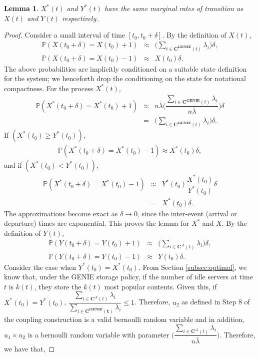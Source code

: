 \documentclass[10pt, conference, letterpaper]{IEEEtran}
\newtheorem{lemma}{Lemma}
\def \idle {k}
\begin{document}
\begin{lemma}
	\label{lemma:marginals}
	$X^*(t)$ and $Y^*(t)$ have the same marginal rates of transition as $X(t)$ and $Y(t)$ respectively.
\end{lemma}
\begin{proof}
	Consider a small interval of time $[t_0, t_0 + \delta]$. By the definition of $X(t)$,
	\begin{eqnarray*}
		\mathbb{P}(X(t_0+\delta) = X(t_0)+1)  &\approx&  \bigg(\sum_{i \in \mathbf{C^{GENIE}}(t)} \lambda_i\bigg) \delta, \\
		\mathbb{P}(X(t_0+\delta) = X(t_0 )-1) &\approx& X(t_0) \delta.
	\end{eqnarray*}
	The above probabilities are implicitly conditioned on a suitable state definition for the system; we henceforth drop the conditioning on the state for notational compactness. For the process $X^*(t)$,
	\begin{eqnarray*}
		\mathbb{P}(X^*(t_0+\delta) = X^*(t_0 )+1) &\approx& n \bar{\lambda} \bigg(\dfrac{\sum_{i \in \mathbf{C^{GENIE}}(t)} \lambda_i}{n \bar{\lambda}}\bigg) \delta \\
		& = & \bigg(\sum_{i \in \mathbf{C^{GENIE}}(t)} \lambda_i\bigg) \delta.
	\end{eqnarray*}
	If $(X^*(t_0) \geq Y^*(t_0))$,
	\begin{eqnarray*}
		\mathbb{P}(X^*(t_0+\delta) = X^*(t_0 )-1) \approx X^*(t_0) \delta,
	\end{eqnarray*}
	and if $(X^*(t_0) < Y^*(t_0))$,
	\begin{eqnarray*}
		\mathbb{P}(X^*(t_0+\delta) = X^*(t_0 )-1) &\approx& Y^*(t_0) \dfrac{X^*(t_0)}{Y^*(t_0)} \delta \\
		&=& X^*(t_0) \delta.
	\end{eqnarray*}
	The approximations become exact as $\delta \rightarrow 0$, since the inter-event (arrival or departure) times are exponential. This proves the lemma for $X^*$ and $X$.
	\newline \newline By the definition of $Y(t)$,
	\begin{eqnarray*}
		\mathbb{P}(Y(t_0+\delta) = Y(t_0 )+1)  &\approx&  \bigg(\sum_{i \in \mathbf{C^{\mathcal{A}}}(t)} \lambda_i\bigg) \delta, \\
		\mathbb{P}(Y(t_0+\delta) = Y(t_0 )-1) &\approx& Y(t_0) \delta.
	\end{eqnarray*}
	Consider the case when $Y^*(t_0 ) = X^*(t_0 )$.
	\newline From Section \ref{subsec:optimal}, we know that, under the GENIE storage policy, if the number of idle servers at time $t$ is $\idle (t)$, they store the $\idle (t)$ most popular contents. Given this, if $X^*(t_0 ) = Y^*(t_0 )$, $\dfrac{\sum_{i \in \mathbf{C^{\mathcal{A}}}(t)} \lambda_i}{\sum_{i \in \mathbf{C^{GENIE}(t)}}\lambda_i} \leq 1$. Therefore, $u_2$ as defined in Step 8 of the coupling construction is a valid bernoulli random variable and in addition, $u_1 \times u_2$ is a bernoulli random variable with parameter $\bigg(\dfrac{\sum_{i \in \mathbf{C^{\mathcal{A}}}(t)} \lambda_i}{n \bar{\lambda}}\bigg)$. Therefore, we have that,

\end{proof}
\end{document}
